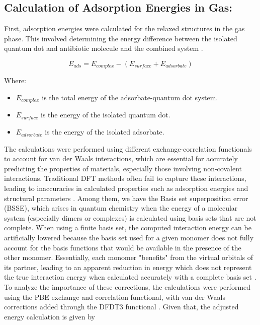 \documentclass[preprint,12pt]{elsarticle}
\begin{document}
	\subsection{Calculation of Adsorption Energies in Gas:} First, adsorption energies were calculated for the relaxed structures in the gas phase. This involved determining the energy difference between the isolated quantum dot and antibiotic molecule and the combined system \cite{Correa2024}.
	
	\begin{equation} E_{ads} = E_{complex} - (E_{surface} + E_{adsorbate}) \end{equation}
	
	Where:
	\begin{itemize}
		\item $E_{complex}$ is the total energy of the adsorbate-quantum dot system.
		\item $E_{surface}$ is the energy of the isolated quantum dot. 
		\item $E_{adsorbate}$ is the energy of the isolated adsorbate. 
	\end{itemize}
	
	The calculations were performed using different exchange-correlation functionals to account for van der Waals interactions, which are essential for accurately predicting the properties of materials, especially those involving non-covalent interactions. Traditional DFT methods often fail to capture these interactions, leading to inaccuracies in calculated properties such as adsorption energies and structural parameters \cite{Sevilla2021Graphene-hexagonal}. 
	Among them, we have the Basis set superposition error (BSSE), which arises in quantum chemistry when the energy of a molecular system (especially dimers or complexes) is calculated using basis sets that are not complete. When using a finite basis set, the computed interaction energy can be artificially lowered because the basis set used for a given monomer does not fully account for the basis functions that would be available in the presence of the other monomer. Essentially, each monomer "benefits" from the virtual orbitals of its partner, leading to an apparent reduction in energy which does not represent the true interaction energy when calculated accurately with a complete basis set \cite{Gutowski1993}.
	To analyze the importance of these corrections, the calculations were performed using the PBE exchange and correlation functional, with van der Waals corrections added through the DFDT3 functional \cite{Mahlberg2019Improved}. Given that, the adjusted energy calculation is given by 
	
\end{document}
